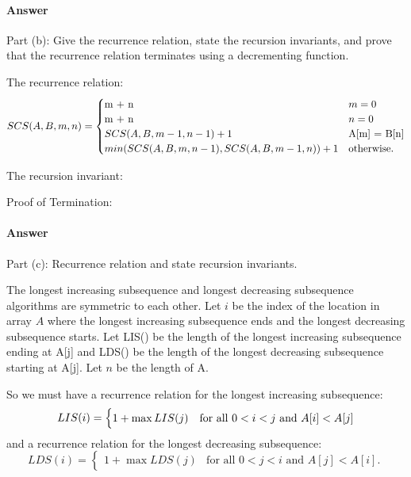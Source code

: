 \documentclass{article}
\begin{document}
\paragraph{Answer}{Part (b): Give the recurrence relation, state the recursion invariants, and prove that the recurrence relation terminates using a decrementing function.}

The recurrence relation: 
\begin{equation}
SCS(A, B, m, n) = 
\begin{cases}
   $m + n$ & \text{$m = 0$}\\
   $m + n$ & \text{$n = 0$}\\
    SCS(A, B, m-1, n-1) + 1 & \text{A[m] = B[n]}\\
    min(SCS(A, B, m, n - 1), SCS(A, B, m - 1, n))+ 1 & \text{otherwise}.
  \end{cases}
\end{equation}

The recursion invariant: \todo{}

Proof of Termination: \todo{}

\paragraph{Answer}{Part (c): Recurrence relation and state recursion invariants.}

The longest increasing subsequence and longest decreasing subsequence algorithms are symmetric to each other. Let $i$ be the index of the location in array $A$ where the longest increasing subsequence ends and the longest decreasing subsequence starts. Let LIS() be the length of the longest increasing subsequence ending at A[j] and LDS() be the length of the longest decreasing subsequence starting at A[j]. Let $n$ be the length of A. 

So we must have a recurrence relation for the longest increasing subsequence: 
\begin{equation}
LIS(i) = 
\begin{cases}
1 + \max{LIS(j)} & \text{for all $ 0 < i < j$ and $A[i] < A[j]$}\\
\end{cases}
\end{equation}
and a recurrence relation for the longest decreasing subsequence:
\begin{equation}
LDS(i) = 
\begin{cases}
1 + \max{LDS(j)} & \text{for all $0 < j < i$ and $A[j] < A[i]$.}
\end{cases}
\end{equation}
\end{document}
